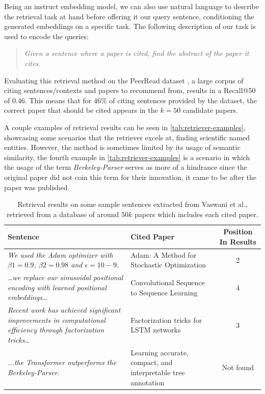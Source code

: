 \documentclass[12pt,a4paper]{report}
\begin{document}
Being an instruct embedding model, we can also use natural language to describe the retrieval task at hand before offering it our query sentence, conditioning the generated embeddings on a specific task. The following description of our task is used to encode the queries:

\begin{quote} \label{quote:prompt}
    \textit{Given a sentence where a paper is cited, find the abstract of the paper it cites.}
\end{quote}

Evaluating this retrieval method on the PeerRead dataset \cite{Kang2018ADO}, a large corpus of citing sentences/contexts and papers to recommend from, results in a Recall@50 of \(0.46\). This means that for \(46\%\) of citing sentences provided by the dataset, the correct paper that should be cited appears in the \(k=50\) candidate papers.
    
A couple examples of retrieval results can be seen in \autoref{tab:retriever-examples}, showcasing some scenarios that the retriever excels at, finding scientific named entities. However, the method is sometimes limited by its usage of semantic similarity, the fourth example in \autoref{tab:retriever-examples} is a scenario in which the usage of the term \textit{Berkeley-Parser} serves as more of a hindrance since the original paper did not coin this term for their innovation, it came to be after the paper was published.

\begin{table}[th]
\centering
\small
\setlength{\tabcolsep}{10pt}
\renewcommand{\arraystretch}{1.3}
\begin{tabularx}{\linewidth}{X X c}
\toprule
\textbf{Sentence} & \textbf{Cited Paper} & \textbf{Position In Results} \\
\midrule
\textit{We used the Adam optimizer with \(\beta1 = 0.9\), \(\beta2 = 0.98\) and \(\epsilon = 10-9.\)} 
& Adam: A Method for Stochastic Optimization & 2 \\
\textit{…we replace our sinusoidal positional encoding with learned positional embeddings…}
 & Convolutional Sequence to Sequence Learning
 & 4 \\
\textit{Recent work has achieved significant improvements in computational efficiency through factorization tricks…}
 & Factorization tricks for LSTM networks
 & 3 \\
 \textit{...the Transformer outperforms the Berkeley-Parser.}
 & Learning accurate, compact, and interpretable tree annotation
 & Not found
 \\
\bottomrule
\end{tabularx}
\caption{Retrieval results on some sample sentences extracted from Vaswani et al.\cite{vaswani2023attentionneed}, retrieved from a database of around \(50k\) papers which includes each cited paper.}
\label{tab:retriever-examples}
\end{table}
\end{document}

